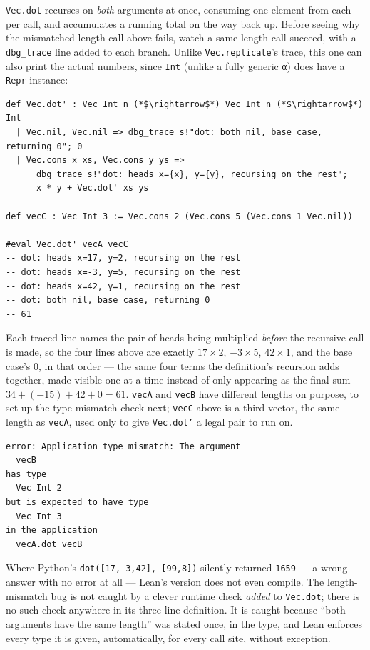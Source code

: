 \texttt{Vec.dot} recurses on \emph{both} arguments at once, consuming one element from each per call, and accumulates a running total on the way back up. Before seeing why the mismatched-length call above fails, watch a same-length call succeed, with a \texttt{dbg\_\allowbreak{}trace} line added to each branch. Unlike \texttt{Vec.replicate}'s trace, this one can also print the actual numbers, since \texttt{Int} (unlike a fully generic \texttt{α}) does have a \texttt{Repr} instance:

\begin{lstlisting}
def Vec.dot' : Vec Int n (*$\rightarrow$*) Vec Int n (*$\rightarrow$*) Int
  | Vec.nil, Vec.nil => dbg_trace s!"dot: both nil, base case, returning 0"; 0
  | Vec.cons x xs, Vec.cons y ys =>
      dbg_trace s!"dot: heads x={x}, y={y}, recursing on the rest";
      x * y + Vec.dot' xs ys

def vecC : Vec Int 3 := Vec.cons 2 (Vec.cons 5 (Vec.cons 1 Vec.nil))

#eval Vec.dot' vecA vecC
-- dot: heads x=17, y=2, recursing on the rest
-- dot: heads x=-3, y=5, recursing on the rest
-- dot: heads x=42, y=1, recursing on the rest
-- dot: both nil, base case, returning 0
-- 61
\end{lstlisting}

Each traced line names the pair of heads being multiplied \emph{before} the recursive call is made, so the four lines above are exactly \(17 \times 2\), \(-3 \times 5\), \(42 \times 1\), and the base case's \(0\), in that order --- the same four terms the definition's recursion adds together, made visible one at a time instead of only appearing as the final sum \(34 + (-15) + 42 + 0 = 61\). \texttt{vecA} and \texttt{vecB} have different lengths on purpose, to set up the type-mismatch check next; \texttt{vecC} above is a third vector, the same length as \texttt{vecA}, used only to give \texttt{Vec.dot'} a legal pair to run on.

\begin{lstlisting}
error: Application type mismatch: The argument
  vecB
has type
  Vec Int 2
but is expected to have type
  Vec Int 3
in the application
  vecA.dot vecB
\end{lstlisting}

Where Python's \texttt{dot([17,-\allowbreak{}3,42], [99,8])} silently returned \texttt{1659} --- a wrong answer with no error at all --- Lean's version does not even compile. The length-mismatch bug is not caught by a clever runtime check \emph{added} to \texttt{Vec.dot}; there is no such check anywhere in its three-line definition. It is caught because ``both arguments have the same length'' was stated once, in the type, and Lean enforces every type it is given, automatically, for every call site, without exception.

